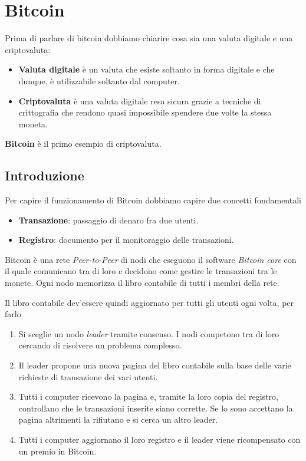 \chapter{Bitcoin}
Prima di parlare di bitcoin dobbiamo chiarire cosa sia una valuta digitale e una criptovaluta:
\begin{itemize}
	\item \textbf{Valuta digitale} \`e un valuta che esiste soltanto in forma digitale e che dunque, \`e
	      utilizzabile soltanto dal computer.
	\item \textbf{Criptovaluta} \`e una valuta digitale resa sicura grazie a tecniche di crittografia che rendono
	      quasi impossibile spendere due volte la stessa moneta.
\end{itemize}
\textbf{Bitcoin} \`e il primo esempio di criptovaluta.

\section{Introduzione}
Per capire il funzionamento di Bitcoin dobbiamo capire due concetti fondamentali
\begin{itemize}
	\item \textbf{Transazione}: passaggio di denaro fra due utenti.
	\item \textbf{Registro}: documento per il monitoraggio delle transazioni.
\end{itemize}
Bitcoin \`e una rete \emph{Peer-to-Peer} di nodi che eseguono il software \emph{Bitcoin core} con il quale comunicano
tra di loro e decidono come gestire le transazioni tra le monete. Ogni nodo memorizza il libro contabile di tutti i
membri della rete.

Il libro contabile dev'essere quindi aggiornato per tutti gli utenti ogni volta, per farlo
\begin{enumerate}
	\item Si sceglie un nodo \emph{leader} tramite consenso. I nodi competono tra di loro cercando di risolvere un
	      problema complesso.
	\item Il leader propone una nuova pagina del libro contabile sulla base delle varie richieste di transazione dei
	      vari utenti.
	\item Tutti i computer ricevono la pagina e, tramite la loro copia del registro, controllano che le transazioni
	      inserite siano corrette. Se lo sono accettano la pagina altrimenti la rifiutano e si cerca un altro leader.
	\item Tutti i computer aggiornano il loro registro e il leader viene ricompensato con un premio in Bitcoin.
\end{enumerate}

